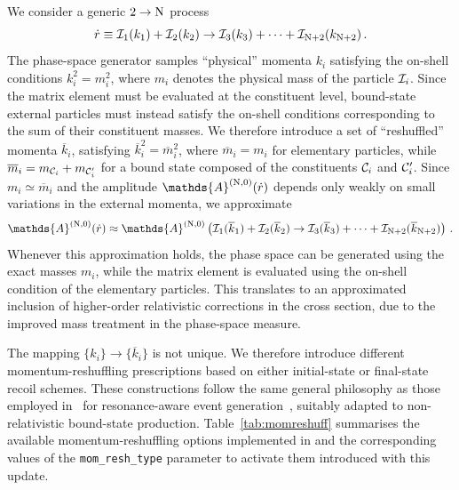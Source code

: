 We consider a generic $2\to {\rm N}$ process
\begin{equation}
    \dot{r} \equiv {\cal I}_1 (k_1)+{\cal I}_2(k_2) \to {\cal I}_3(k_3) + \dots + {\cal I}_{{\rm N}+2}(k_{{\rm N}+2})\,.
\end{equation}
The phase-space generator samples ``physical'' momenta $k_i$ satisfying the on-shell conditions $k_i^2=m_i^2$, where $m_i$ denotes the physical mass of the particle ${\cal I}_i$. Since the matrix element must be evaluated at the constituent level, bound-state external particles must instead satisfy the on-shell conditions corresponding to the sum of their constituent masses. We therefore introduce a set of ``reshuffled'' momenta $\overline{k}_i$, satisfying $\overline{k}_i^2=\overline{m}_i^2$, where $\overline{m}_i=m_i$ for elementary particles, while $\overline{m}_i=m_{{\cal C}_i}+m_{{\cal C}^\prime_i}$ for a bound state composed of the constituents ${\cal C}_i$ and ${\cal C}_i^\prime$. Since $m_i \simeq \overline{m}_i$ and the amplitude $\mathds{A}^{({\rm N},0)}(\dot r)$ depends only weakly on small variations in the external momenta, we approximate
\begin{equation}
    \mathds{A}^{({\rm N},0)}(\dot{r}) \approx \mathds{A}^{({\rm N},0)}\left(\Ione (\overline{k}_1)+\Itwo(\overline{k}_2) \to \ident_3(\overline{k}_3) + \dots + \ident_{{\rm N}+2}(\overline{k}_{{\rm N}+2})\right)\,.
\label{eq:resh_matrix_element_approx}
\end{equation}
Whenever this approximation holds, the phase space can be generated using the exact masses $m_i$, while the matrix element is evaluated using the on-shell condition of the elementary particles. 
This translates to an approximated inclusion of higher-order relativistic corrections in the cross section, due to the improved mass treatment in the phase-space measure.

The mapping $\{{k_i}\}\rightarrow\{{\overline{k}_i}\}$ is not unique. We therefore introduce different momentum-reshuffling prescriptions based on either initial-state or final-state recoil schemes.
These constructions follow the same general philosophy as those employed in \mgshort\ for resonance-aware event generation~\cite{Artoisenet:2012st,Frixione:2019fxg}, suitably adapted to non-relativistic bound-state production. Table~\ref{tab:momreshuff} summarises the available momentum-reshuffling options implemented in \mgshort{} and the corresponding values of the \texttt{mom\_resh\_type} parameter to activate them introduced with this update.

